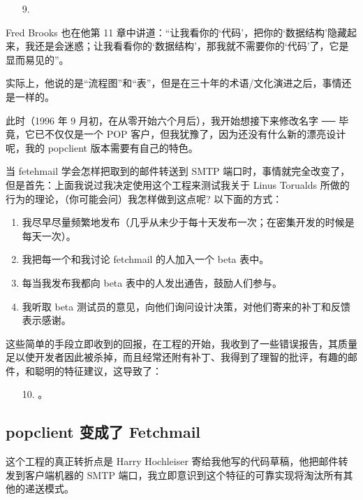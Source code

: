 \begin{enumerate}
\item[9.] 
\end{enumerate}

Fred Brooks 也在他第 11 章中讲道：“让我看你的‘代码’，把你的‘数据结构’隐藏起来，我还是会迷惑；让我看看你的‘数据结构’，那我就不需要你的‘代码’了，它是显而易见的”。


实际上，他说的是“流程图”和“表”，但是在三十年的术语/文化演进之后，事情还是一样的。


此时（1996 年 9 月初，在从零开始六个月后），我开始想接下来修改名字 ── 毕竟，它已不仅仅是一个 POP 客户，但我犹豫了，因为还没有什么新的漂亮设计呢，我的 popclient 版本需要有自己的特色。

当 fetehmail 学会怎样把取到的邮件转送到 SMTP 端口时，事情就完全改变了，但是首先：上面我说过我决定使用这个工程来测试我关于 Linus Torualds 所做的行为的理论，（你可能会问）我怎样做到这点呢? 以下面的方式：

\begin{enumerate}
\item 我尽早尽量频繁地发布（几乎从未少于每十天发布一次；在密集开发的时候是每天一次）。
\item 我把每一个和我讨论 fetchmail 的人加入一个 beta 表中。
\item 每当我发布我都向 beta 表中的人发出通告，鼓励人们参与。
\item 我听取 beta 测试员的意见，向他们询问设计决策，对他们寄来的补丁和反馈表示感谢。
\end{enumerate}

这些简单的手段立即收到的回报，在工程的开始，我收到了一些错误报告，其质量足以使开发者因此被杀掉，而且经常还附有补丁、我得到了理智的批评，有趣的邮件，和聪明的特征建议，这导致了：

\begin{enumerate}
\item[10.] 。
\end{enumerate}

\subsection{popclient 变成了 Fetchmail}


这个工程的真正转折点是 Harry Hochleiser 寄给我他写的代码草稿，他把邮件转发到客户端机器的 SMTP 端口，我立即意识到这个特征的可靠实现将淘汰所有其他的递送模式。


